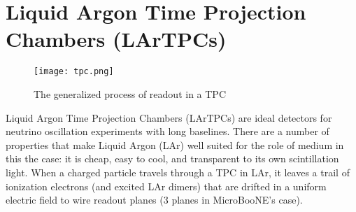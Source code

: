 \documentclass[12pt]{article}
\begin{document}
\section{Liquid Argon Time Projection Chambers (LArTPCs)}
\begin{figure}[h!]
\centering
\texttt{[image: tpc.png]}
\caption{The generalized process of readout in a TPC}
\end{figure}
\par Liquid Argon Time Projection Chambers (LArTPCs) are ideal detectors for neutrino oscillation experiments with long baselines.  There are a number of properties that make Liquid Argon (LAr) well suited for the role of medium in this the case: it is cheap, easy to cool, and transparent to its own scintillation light.  When a charged particle travels through a TPC in LAr, it leaves a trail of ionization electrons (and excited LAr dimers) that are drifted in a uniform electric field to wire readout planes (3 planes in MicroBooNE's case). 
\end{document}
